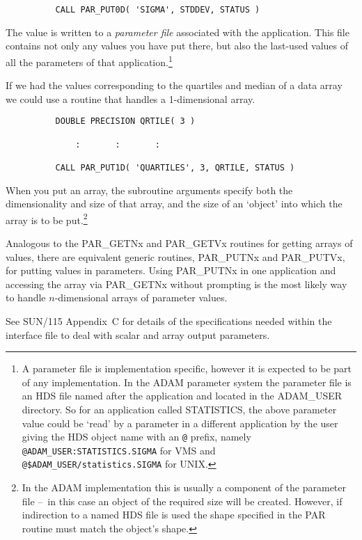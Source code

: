 \documentclass[twoside,11pt]{article}
\newcommand{\xref}[3]{#1}
\newcommand{\latex}[1]{#1}
\newcommand{\dash}{--}
\newcommand{\dash}{-}
\begin{document}
\begin{verbatim}
          CALL PAR_PUT0D( 'SIGMA', STDDEV, STATUS )
\end{verbatim}

The value is written to a {\em parameter file\/} associated with the
application.  This file contains not only any values you have put there,
but also the last-used values of all the parameters of that
application.\footnote{A parameter file is implementation specific,
however it is expected to be part of any implementation.  In the ADAM
parameter system the parameter file is an HDS file named after the
application and located in the ADAM\_USER directory. So for an application
called STATISTICS, the above parameter value could be `read' by a
parameter in a different application by the user giving the HDS object
name with an {\tt @} prefix, namely {\tt @ADAM\_USER:STATISTICS.SIGMA}
for VMS and {\tt @\$ADAM\_USER/statistics.SIGMA} for UNIX.} 

If we had the values corresponding to the quartiles and median of a
data array we could use a routine that handles a 1-dimensional array.
\begin{verbatim}
          DOUBLE PRECISION QRTILE( 3 )

              :       :       :

          CALL PAR_PUT1D( 'QUARTILES', 3, QRTILE, STATUS )
\end{verbatim}

When you put an array, the subroutine arguments specify both the
dimensionality and size of that array, and the size of an `object' into
which the array is to be put.\footnote{In the ADAM implementation this
is usually a component of the parameter file \dash\ in this case an object of
the required size will be created.  However, if indirection to a named
HDS file is used the shape specified in the PAR routine must match the
object's shape.} 

Analogous to the PAR\_GETNx and PAR\_GETVx routines for getting arrays
of values, there are equivalent generic routines, PAR\_PUTNx and
PAR\_PUTVx, for putting values in parameters.  Using PAR\_PUTNx in one
application and accessing the array via PAR\_GETNx without prompting is
the most likely way to handle $n$-dimensional arrays of parameter
values. 

See 
\xref{SUN/115}{sun115}{parameter_specification_for_output_parameters} 
\latex{Appendix~C} for details of the specifications needed within
the interface file to deal with scalar and array output parameters. 
\end{document}
